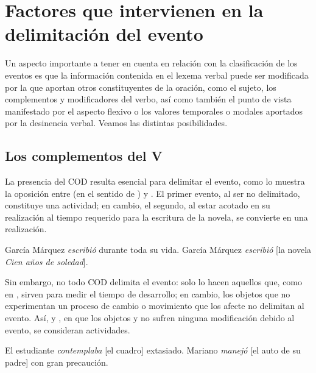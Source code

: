 \section{Factores que intervienen en la delimitación del evento}\label{sec:08-factores}

Un aspecto importante a tener en cuenta en relación con la clasificación de los
eventos es que la información contenida en el lexema verbal puede ser
modificada por la que aportan otros constituyentes de la oración, como el
sujeto, los complementos y modificadores del verbo, así como también el punto de
vista manifestado por el aspecto flexivo o los valores temporales o modales
aportados por la desinencia verbal. Veamos las distintas posibilidades.

\subsection{Los complementos del V}\label{sec:08-complementos}

La presencia del COD resulta esencial para delimitar el evento, como lo muestra
la oposición entre  (en el sentido de )
 y  . El primer
evento, al ser no delimitado, constituye una actividad; en cambio, el segundo,
al estar acotado en su realización al tiempo requerido para la escritura de la
novela, se convierte en una realización.

\begin{exe}
  \ex\label{ex:08-gm1} García Márquez \textit{escribió} durante toda su vida.
  \ex\label{ex:08-gm2} García Márquez \textit{escribió} [la novela \textit{Cien
      años de soledad}].
\end{exe}

Sin embargo, no todo COD delimita el evento: solo lo hacen aquellos que, como
 en , sirven para medir
el tiempo de desarrollo; en cambio, los objetos que no experimentan un proceso
de cambio o movimiento que los afecte no delimitan al evento. Así,
 y , en que los objetos  y
 no sufren ninguna modificación debido al evento, se
consideran actividades.

\begin{exe}
  \ex\label{ex:08-cuadro} El estudiante \textit{contemplaba} [el cuadro]
      extasiado.
  \ex\label{ex:08-auto} Mariano \textit{manejó} [el auto de su padre] con gran
      precaución.
\end{exe}

